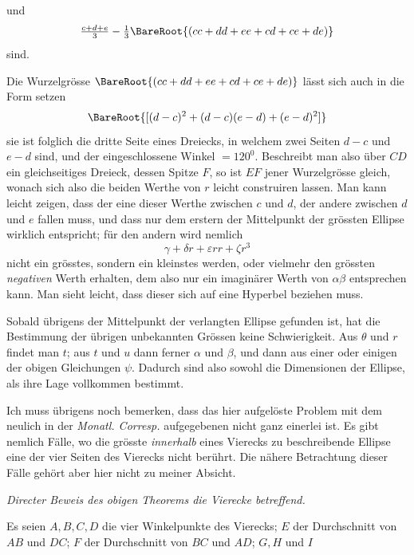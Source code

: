 %
und
\[
\tfrac{c+d+e}{3}-\tfrac13\BareRoot{(cc+dd+ee+cd+ce+de)}
\]
sind.

Die Wurzelgrösse \(\BareRoot{(cc+dd+ee+cd+ce+de)}\) lässt sich auch in die Form setzen
\[
\BareRoot{[(d-c)^2+(d-c)(e-d)+(e-d)^2]}
\]
sie ist folglich die dritte Seite eines Dreiecks, in welchem zwei Seiten \(d-c\) und \(e-d\) sind, und der eingeschlossene Winkel \(=120^0\). Beschreibt man also über \(CD\) ein gleichseitiges Dreieck, dessen Spitze \(F\), so ist \(EF\) jener Wurzelgrösse gleich, wonach sich also die beiden Werthe von \(r\) leicht construiren lassen. Man kann leicht zeigen, dass der eine dieser Werthe zwischen \(c\) und \(d\), der andere zwischen \(d\) und \(e\) fallen muss, und dass nur dem erstern der Mittelpunkt der grössten Ellipse wirklich entspricht; für den andern wird nemlich
\[
\gamma+\delta r+\varepsilon rr+\zeta r^3
\]
nicht ein grösstes, sondern ein kleinstes werden, oder vielmehr den grössten \textit{negativen} Werth erhalten, dem also nur ein imaginärer Werth von \(\alpha\beta\) entsprechen kann. Man sieht leicht, dass dieser sich auf eine Hyperbel beziehen muss.

Sobald übrigens der Mittelpunkt der verlangten Ellipse gefunden ist, hat die Bestimmung der übrigen unbekannten Grössen keine Schwierigkeit. Aus \(\theta\) und \(r\) findet man \(t\); aus \(t\) und \(u\) dann ferner \(\alpha\) und \(\beta\), und dann aus einer oder einigen der obigen Gleichungen \(\psi\). Dadurch sind also sowohl die Dimensionen der Ellipse, als ihre Lage vollkommen bestimmt.

Ich muss übrigens noch bemerken, dass das hier aufgelöste Problem mit dem neulich in der \textit{Monatl. Corresp.} aufgegebenen nicht ganz einerlei ist. Es gibt nemlich Fälle, wo die grösste \textit{innerhalb} eines Vierecks zu beschreibende Ellipse eine der vier Seiten des Vierecks nicht berührt. Die nähere Betrachtung dieser Fälle gehört aber hier nicht zu meiner Absicht.

\par\medskip{}
\begin{center}\textit{Directer Beweis des obigen Theorems die Vierecke betreffend.}\end{center}
\hspace*{\parindent}Es seien \(A,B,C,D\) die vier Winkelpunkte des Vierecks; \(E\) der Durchschnitt von \(AB\) und \(DC\); \(F\) der Durchschnitt von \(BC\) und \(AD\); \(G,H\) und \(I\)
